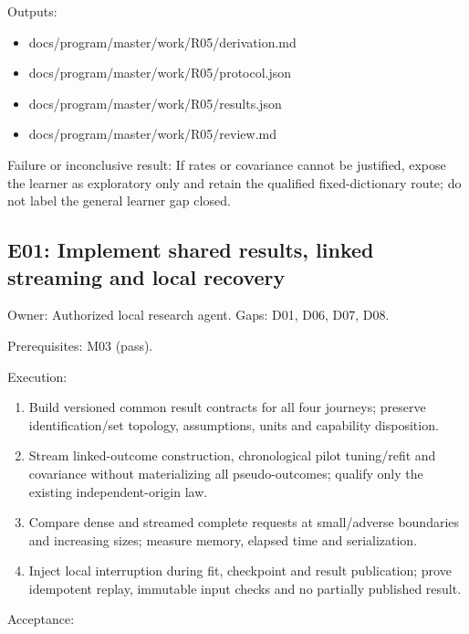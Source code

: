 \documentclass[
  11pt,
  a4paper,
]{article}
\providecommand{\tightlist}{%
  \setlength{\itemsep}{0pt}\setlength{\parskip}{0pt}}
\begin{document}
Outputs:

\begin{itemize}
\tightlist
\item
  docs/program/master/work/R05/derivation.md
\item
  docs/program/master/work/R05/protocol.json
\item
  docs/program/master/work/R05/results.json
\item
  docs/program/master/work/R05/review.md
\end{itemize}

Failure or inconclusive result: If rates or covariance cannot be
justified, expose the learner as exploratory only and retain the
qualified fixed-dictionary route; do not label the general learner gap
closed.

\hypertarget{e01-implement-shared-results-linked-streaming-and-local-recovery}{%
\subsection{E01: Implement shared results, linked streaming and local
recovery}\label{e01-implement-shared-results-linked-streaming-and-local-recovery}}

Owner: Authorized local research agent. Gaps: D01, D06, D07, D08.

Prerequisites: M03 (pass).

Execution:

\begin{enumerate}
\def\labelenumi{\arabic{enumi}.}
\tightlist
\item
  Build versioned common result contracts for all four journeys;
  preserve identification/set topology, assumptions, units and
  capability disposition.
\item
  Stream linked-outcome construction, chronological pilot tuning/refit
  and covariance without materializing all pseudo-outcomes; qualify only
  the existing independent-origin law.
\item
  Compare dense and streamed complete requests at small/adverse
  boundaries and increasing sizes; measure memory, elapsed time and
  serialization.
\item
  Inject local interruption during fit, checkpoint and result
  publication; prove idempotent replay, immutable input checks and no
  partially published result.
\end{enumerate}

Acceptance:
\end{document}
